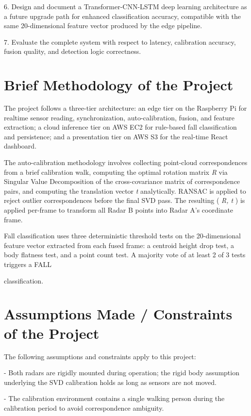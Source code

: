 6. Design and document a Transformer-CNN-LSTM deep learning architecture as a future upgrade path for enhanced classification accuracy, compatible with the same 20-dimensional feature vector produced by the edge pipeline. 

7. Evaluate the complete system with respect to latency, calibration accuracy, fusion quality, and detection logic correctness. 

\section{Brief Methodology of the Project}

The project follows a three-tier architecture: an edge tier on the Raspberry Pi for realtime sensor reading, synchronization, auto-calibration, fusion, and feature extraction; a cloud inference tier on AWS EC2 for rule-based fall classification and persistence; and a presentation tier on AWS S3 for the real-time React dashboard. 

The auto-calibration methodology involves collecting point-cloud correspondences from a brief calibration walk, computing the optimal rotation matrix \textit{R} via Singular Value Decomposition of the cross-covariance matrix of correspondence pairs, and computing the translation vector \textit{t} analytically. RANSAC is applied to reject outlier correspondences before the final SVD pass. The resulting ( \textit{R, t} ) is applied per-frame to transform all Radar B points into Radar A's coordinate frame. 

Fall classification uses three deterministic threshold tests on the 20-dimensional feature vector extracted from each fused frame: a centroid height drop test, a body flatness test, and a point count test. A majority vote of at least 2 of 3 tests triggers a FALL 


classification. 

\section{Assumptions Made / Constraints of the Project}

The following assumptions and constraints apply to this project: 

- Both radars are rigidly mounted during operation; the rigid body assumption underlying the SVD calibration holds as long as sensors are not moved. 

- The calibration environment contains a single walking person during the calibration period to avoid correspondence ambiguity. 

